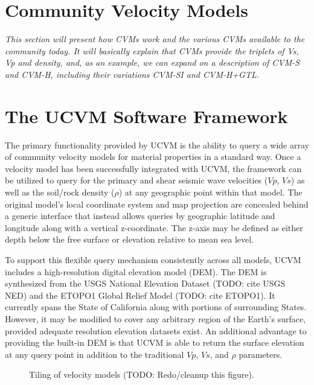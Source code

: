 


\section{Community Velocity Models}
\label{sec:cvms}

\textit{
\color{blue}
This section will present how CVMs work and the various CVMs available to the community today. It will basically explain that CVMs provide the triplets of Vs, Vp and density, and, as an example, we can expand on a description of CVM-S and CVM-H, including their variations CVM-SI and CVM-H+GTL.
}

\section{The UCVM Software Framework}\label{sec:ucvm}
The primary functionality provided by UCVM is the ability to query a wide array of community velocity models for material properties in a standard way. Once a velocity model has been successfully integrated with UCVM, the framework can be utilized to query for the primary and shear seismic wave velocities ($Vp$, $Vs$) as well as the soil/rock density ($\rho$) at any geographic point within that model. The original model's local coordinate system and map projection are concealed behind a generic interface that instead allows queries by geographic latitude and longitude along with a vertical z-coordinate. The z-axis may be defined as either depth below the free surface or elevation relative to mean sea level.

To support this flexible query mechanism consistently across all models, UCVM includes a high-resolution digital elevation model (DEM). The DEM is synthesized from the USGS National Elevation Dataset (TODO: cite USGS NED) and the ETOPO1 Global Relief Model (TODO: cite ETOPO1). It currently spans the State of California along with portions of surrounding States. However, it may be modified to cover any arbitrary region of the Earth's surface, provided adequate resolution elevation datasets exist. An additional advantage to providing the built-in DEM is that UCVM is able to return the surface elevation at any query point in addition to the traditional $Vp$, $Vs$, and $\rho$ parameters.
\begin{figure}
\centering
{}
\caption{Tiling of velocity models (TODO: Redo/cleanup this figure).}\label{fig:tiling}
\end{figure}

